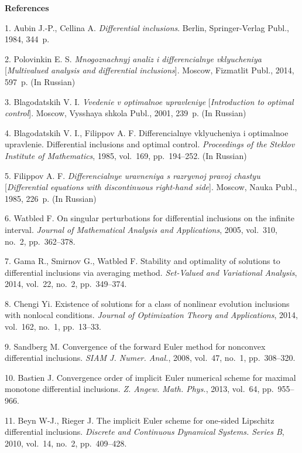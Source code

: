 

{\small



\vskip6mm

\noindent \textbf{References} }

\vskip 2mm

{\footnotesize

1. {Aubin J.-P., Cellina A.} {\it Differential inclusions}.
Berlin, Springer-Verlag Publ., 1984, 344~p.

2. {Polovinkin E. S.} {\it Mnogoznachnyj analiz i differencialnye
vklyucheniya} [{\it Multivalued analysis and differential
inclusions}]. Moscow, Fizmatlit Publ., 2014, 597~p. (In Russian)

3. {Blagodatskih V. I.} {\it Vvedenie v optimalnoe upravleniye}
[{\it Introduction to optimal control}]. Moscow, Vysshaya shkola
Publ., 2001, 239~p. (In Russian)

4. {Blagodatskih V. I., Filippov A. F.} Differencialnye
vklyucheniya i optimalnoe upravlenie. Differential inclusions and
optimal control. {\it Proceedings of the Steklov Institute of
Mathematics}, 1985, vol.~169, pp.~194--252. (In Russian)

5. {Filippov A. F.} {\it Differencialnye uravneniya s razryvnoj
pravoj chastyu} [{\it Differential equations with discontinuous
right-hand side}]. Moscow, Nauka Publ., 1985, 226~p. (In Russian)

6. {Watbled F.} On singular perturbations for differential
inclusions on the infinite interval. {\it Journal of Mathematical
Analysis and Applications}, 2005, vol.~310, no.~2, pp.~362--378.

7. {Gama R., Smirnov G., Watbled F.} Stability and optimality of
solutions to differential inclusions via averaging method. {\it
Set-Valued and Variational Analysis}, 2014, vol.~22, no.~2,
pp.~349--374.

8. {Chengi Yi.} Existence of solutions for a class of nonlinear
evolution inclusions with nonlocal conditions. {\it Journal of
Optimization Theory and Applications}, 2014, vol.~162, no.~1,
pp.~13--33.

9. {Sandberg M.} Convergence of the forward Euler method for
nonconvex differential inclusions. {\it SIAM J. Numer. Anal.},
2008, vol.~47, no.~1, pp.~308--320.

10. {Bastien J.} Convergence order of implicit Euler numerical
scheme for maximal monotone differential inclusions. {\it Z.
Angew. Math. Phys.},  2013, vol.~64, pp.~955--966.

11. {Beyn W-J., Rieger J.} The implicit Euler scheme for one-sided
Lipschitz differential inclusions. {\it Discrete and Continuous
Dynamical Systems. Series B}, 2010, vol.~14, no.~2, pp.~409--428.

}
